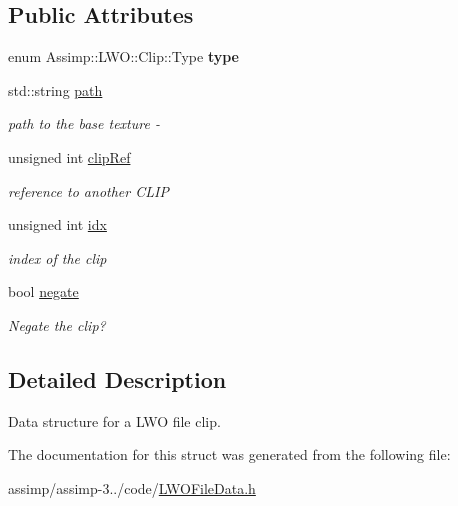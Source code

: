 \subsection*{Public Attributes}
\begin{DoxyCompactItemize}
\item 
\hypertarget{struct_assimp_1_1_l_w_o_1_1_clip_a0c2f35ff030874974e98d85def217d29}{enum Assimp\+::\+L\+W\+O\+::\+Clip\+::\+Type {\bfseries type}}\label{struct_assimp_1_1_l_w_o_1_1_clip_a0c2f35ff030874974e98d85def217d29}

\item 
\hypertarget{struct_assimp_1_1_l_w_o_1_1_clip_aa53f8d361fb8220cc55a27e69148d01a}{std\+::string \hyperlink{struct_assimp_1_1_l_w_o_1_1_clip_aa53f8d361fb8220cc55a27e69148d01a}{path}}\label{struct_assimp_1_1_l_w_o_1_1_clip_aa53f8d361fb8220cc55a27e69148d01a}

\begin{DoxyCompactList}\small\item\em path to the base texture -\/ \end{DoxyCompactList}\item 
\hypertarget{struct_assimp_1_1_l_w_o_1_1_clip_a2c143edb9ee7bfc39289e59451505590}{unsigned int \hyperlink{struct_assimp_1_1_l_w_o_1_1_clip_a2c143edb9ee7bfc39289e59451505590}{clip\+Ref}}\label{struct_assimp_1_1_l_w_o_1_1_clip_a2c143edb9ee7bfc39289e59451505590}

\begin{DoxyCompactList}\small\item\em reference to another C\+L\+I\+P \end{DoxyCompactList}\item 
\hypertarget{struct_assimp_1_1_l_w_o_1_1_clip_ac7e1cbc5314d7f269d6029eb9620c2de}{unsigned int \hyperlink{struct_assimp_1_1_l_w_o_1_1_clip_ac7e1cbc5314d7f269d6029eb9620c2de}{idx}}\label{struct_assimp_1_1_l_w_o_1_1_clip_ac7e1cbc5314d7f269d6029eb9620c2de}

\begin{DoxyCompactList}\small\item\em index of the clip \end{DoxyCompactList}\item 
\hypertarget{struct_assimp_1_1_l_w_o_1_1_clip_aa510ca0b078f1089695ced5bd587e6b4}{bool \hyperlink{struct_assimp_1_1_l_w_o_1_1_clip_aa510ca0b078f1089695ced5bd587e6b4}{negate}}\label{struct_assimp_1_1_l_w_o_1_1_clip_aa510ca0b078f1089695ced5bd587e6b4}

\begin{DoxyCompactList}\small\item\em Negate the clip? \end{DoxyCompactList}\end{DoxyCompactItemize}


\subsection{Detailed Description}
Data structure for a L\+W\+O file clip. 

The documentation for this struct was generated from the following file\+:\begin{DoxyCompactItemize}
\item 
assimp/assimp-\/3../code/\hyperlink{_l_w_o_file_data_8h}{L\+W\+O\+File\+Data.\+h}\end{DoxyCompactItemize}

